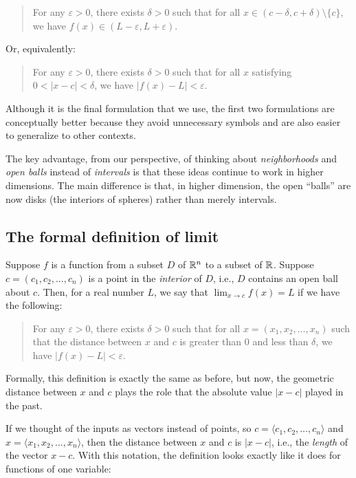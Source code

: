\documentclass[10pt]{amsart}
\begin{document}
\begin{quote}
  For any $\varepsilon > 0$, there exists $\delta > 0$ such that for all
  $x \in (c - \delta,c+\delta) \setminus \{ c \}$, we have $f(x) \in
  (L - \varepsilon, L + \varepsilon)$.
\end{quote}

Or, equivalently:

\begin{quote}
  For any $\varepsilon > 0$, there exists $\delta > 0$ such that for all
  $x$ satisfying $0 < |x - c| < \delta$, we have $|f(x) - L| < \varepsilon$.
\end{quote}

Although it is the final formulation that we use, the first two
formulations are conceptually better because they avoid unnecessary
symbols and are also easier to generalize to other contexts.

The key advantage, from our perspective, of thinking about {\em
neighborhoods} and {\em open balls} instead of {\em intervals} is that
these ideas continue to work in higher dimensions. The main difference
is that, in higher dimension, the open ``balls'' are now disks (the
interiors of spheres) rather than merely intervals.

\subsection{The formal definition of limit}

Suppose $f$ is a function from a subset $D$ of $\mathbb{R}^n$ to a subset of
$\mathbb{R}$. Suppose $c = (c_1,c_2,\dots,c_n)$ is a point in the {\em
interior} of $D$, i.e., $D$ contains an open ball about $c$. Then, for
a real number $L$, we say that $\lim_{x \to c} f(x) = L$ if we have
the following:

\begin{quote}
  For any $\varepsilon > 0$, there exists $\delta > 0$ such that for all
  $x = (x_1,x_2,\dots,x_n)$ such that the distance between $x$ and $c$
  is greater than $0$ and less than $\delta$, we have $|f(x) - L| <
  \varepsilon$.
\end{quote}

Formally, this definition is exactly the same as before, but now, the
geometric distance between $x$ and $c$ plays the role that the
absolute value $|x - c|$ played in the past.

If we thought of the inputs as vectors instead of points, so $c =
\langle c_1, c_2, \dots, c_n \rangle$ and $x = \langle x_1, x_2,
\dots, x_n \rangle$, then the distance between $x$ and $c$ is $|x -
c|$, i.e., the {\em length} of the vector $x - c$. With this notation,
the definition looks exactly like it does for functions of one
variable:
\end{document}
